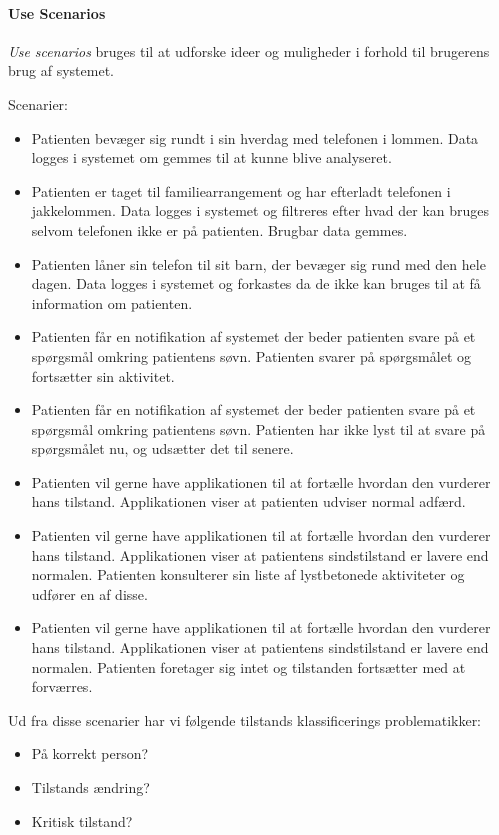 \paragraph{Use Scenarios}
\textit{Use scenarios} bruges til at udforske ideer og muligheder i forhold til brugerens brug af systemet.

Scenarier:
\begin{itemize}
	\item Patienten bevæger sig rundt i sin hverdag med telefonen i lommen. 
	Data logges i systemet om gemmes til at kunne blive analyseret.
	\item Patienten er taget til familiearrangement og har efterladt telefonen i jakkelommen.
	Data logges i systemet og filtreres efter hvad der kan bruges selvom telefonen ikke er på patienten.
	Brugbar data gemmes.
	\item Patienten låner sin telefon til sit barn, der bevæger sig rund med den hele dagen.
	Data logges i systemet og forkastes da de ikke kan bruges til at få information om patienten.
	\item Patienten får en notifikation af systemet der beder patienten svare på et spørgsmål omkring patientens søvn.
	Patienten svarer på spørgsmålet og fortsætter sin aktivitet.
	\item Patienten får en notifikation af systemet der beder patienten svare på et spørgsmål omkring patientens søvn.
	Patienten har ikke lyst til at svare på spørgsmålet nu, og udsætter det til senere.
	\item Patienten vil gerne have applikationen til at fortælle hvordan den vurderer hans tilstand.
	Applikationen viser at patienten udviser normal adfærd.
	\item Patienten vil gerne have applikationen til at fortælle hvordan den vurderer hans tilstand.
	Applikationen viser at patientens sindstilstand er lavere end normalen.
	Patienten konsulterer sin liste af lystbetonede aktiviteter og udfører en af disse.
	\item Patienten vil gerne have applikationen til at fortælle hvordan den vurderer hans tilstand.
	Applikationen viser at patientens sindstilstand er lavere end normalen.
	Patienten foretager sig intet og tilstanden fortsætter med at forværres.
\end{itemize}

Ud fra disse scenarier har vi følgende tilstands klassificerings problematikker:
\begin{itemize}
\item På korrekt person?
\item Tilstands ændring?
\item Kritisk tilstand?
\end{itemize}

